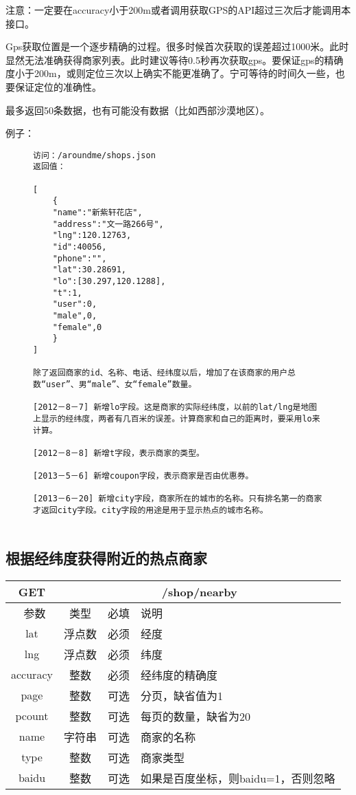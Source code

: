 \documentclass[cs4size]{ctexartutf8}
\begin{document}
注意：一定要在accuracy小于200m或者调用获取GPS的API超过三次后才能调用本接口。

Gps获取位置是一个逐步精确的过程。很多时候首次获取的误差超过1000米。此时显然无法准确获得商家列表。此时建议等待0.5秒再次获取gps。要保证gps的精确度小于200m，或则定位三次以上确实不能更准确了。宁可等待的时间久一些，也要保证定位的准确性。

最多返回50条数据，也有可能没有数据（比如西部沙漠地区）。

例子：

\begin{figure}[H]
\begin{verbatim}
访问：/aroundme/shops.json
返回值：

[
	{
	"name":"新紫轩花店",
	"address":"文一路266号",
	"lng":120.12763,
	"id":40056,
	"phone":"",
	"lat":30.28691,
	"lo":[30.297,120.1288],
	"t":1,
	"user":0,
	"male",0,
	"female",0
	}
]

除了返回商家的id、名称、电话、经纬度以后，增加了在该商家的用户总数“user”、男“male”、女“female”数量。

[2012－8－7] 新增lo字段。这是商家的实际经纬度，以前的lat/lng是地图上显示的经纬度，两者有几百米的误差。计算商家和自己的距离时，要采用lo来计算。

[2012－8－8] 新增t字段，表示商家的类型。

[2013－5－6] 新增coupon字段，表示商家是否由优惠券。

[2013－6－20] 新增city字段，商家所在的城市的名称。只有排名第一的商家才返回city字段。city字段的用途是用于显示热点的城市名称。


\end{verbatim}
\end{figure}



\subsection{根据经纬度获得附近的热点商家}

\begin{table}[H]
   \begin{center}
\begin{tabular}{|c|c|c|p{12cm}|}
\hline
GET & \multicolumn{3}{|c|}{/shop/nearby} \\
\hline\hline
 \  参数  & 类型 & 必填 &  说明  \\
\hline
 lat  & 浮点数 & 必须 & 经度\\
\hline
 lng  &  浮点数 & 必须 & 纬度\\ 
\hline
 accuracy  & 整数 & 必须 & 经纬度的精确度\\ 
 \hline
 page  & 整数 & 可选 & 分页，缺省值为1\\ 
 \hline
 pcount  & 整数 & 可选 & 每页的数量，缺省为20\\ 
  \hline
 name  & 字符串 & 可选 & 商家的名称\\ 
  \hline
 type  & 整数 & 可选 & 商家类型\\  
\hline
 baidu  & 整数 & 可选 & 如果是百度坐标，则baidu=1，否则忽略\\  
\hline
\end{tabular}
   \end{center}
\end{table}
\end{document}
